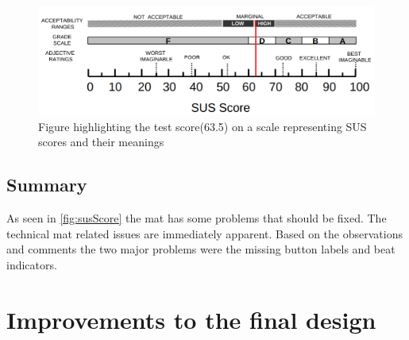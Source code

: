 \begin{figure}[H]
	\centering
	\includegraphics[width=1\linewidth]{figure/Design/susScore}
	\caption{Figure highlighting the test score(63.5) on a scale representing SUS scores and their meanings\cite{susScore}}
	\label{fig:susScore}
\end{figure}

\subsection{Summary}
As seen in \autoref{fig:susScore} the mat has some problems that should be fixed. The technical mat related issues are immediately apparent. Based on the observations and comments the two major problems were the missing button labels and beat indicators.

\section{Improvements to the final design}
